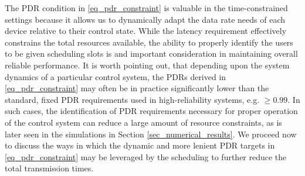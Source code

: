 The PDR condition in \eqref{eq_pdr_constraint} is valuable in the time-constrained settings because it allows us to dynamically adapt the data rate needs of each device relative to their control state. While the latency requirement effectively constrains the total resources available, the ability to properly identify the users to be given scheduling slots is and important consideration in maintaining overall reliable performance. It is worth pointing out, that depending upon the system dynamics of a particular control system, the PDRs derived in \eqref{eq_pdr_constraint} may often be in practice significantly lower than the standard, fixed PDR requirements used in high-reliability systems, e.g. $\geq 0.99$. In such cases, the identification of PDR requirements necessary for proper operation of the control system can reduce a large amount of resource constraints, as is later seen in the simulations in Section \ref{sec_numerical_results}. We proceed now to discuss the ways in which the dynamic and more lenient PDR targets in \eqref{eq_pdr_constraint} may be leveraged by the scheduling to further reduce the total transmission times.


